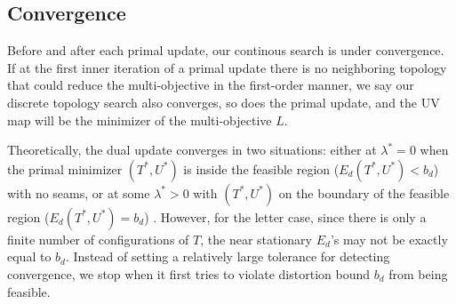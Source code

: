\subsection{Convergence}

Before and after each primal update, our continous search is under convergence. If at the first inner iteration of a primal update there is no neighboring topology that could reduce the multi-objective in the first-order manner, we say our discrete topology search also converges, so does the primal update, and the UV map will be the minimizer of the multi-objective $L$.

Theoretically, the dual update converges in two situations: either at $\lambda^* = 0$ when the primal minimizer $(T^*, U^*)$ is inside the feasible region ($E_d(T^*, U^*) < b_d$) with no seams, or at some $\lambda^* > 0$ with $(T^*, U^*)$ on the boundary of the feasible region ($E_d(T^*, U^*) = b_d$) \cite{a computational optimization book}. However, for the letter case, since there is only a finite number of configurations of $T$, the near stationary $E_d$'s may not be exactly equal to $b_d$. Instead of setting a relatively large tolerance for detecting convergence, we stop when it first tries to violate distortion bound $b_d$ from being feasible.
